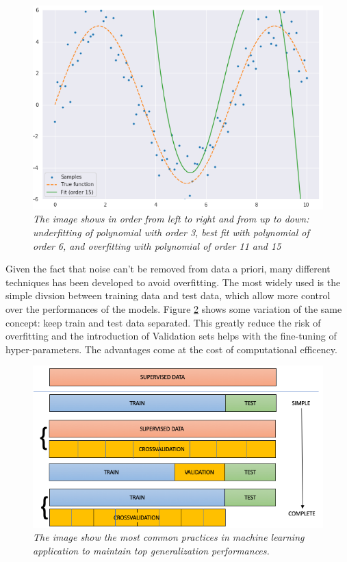 \documentclass[11pt,a4paper]{article}
\begin{document}
\begin{figure}[H]
 \includegraphics[scale=0.35]{../images/fit_nlinear_order15.png}
 \caption{\textit{The image shows in order from left to right and from up to down: underfitting of polynomial with order 3, best fit with polynomial of order 6, and overfitting with polynomial of order 11 and 15}}  
 \label{polyfit}
 
\end{figure}

Given the fact that noise can't be removed from data a priori, many different techniques has been developed to avoid overfitting. 
The most widely used is the simple divsion between training data and test data, which allow more control over the performances of the models. 
Figure \ref{scheme} shows some variation of the same concept: keep train and test data separated.
This greatly reduce the risk of overfitting and the introduction of Validation sets helps with the fine-tuning of hyper-parameters. 
The advantages come at the cost of computational efficency.

\begin{figure}[H]
 \centering
 \includegraphics[scale=0.5]{../images/test_train_process.png}
 \caption{\textit{The image show the most common practices in machine learning application to maintain top generalization performances.}}  
 \label{scheme}
\end{figure}
\end{document}

